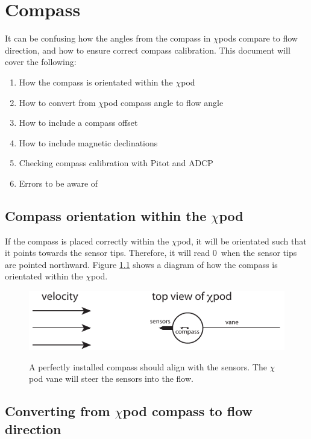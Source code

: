 \chapter{Compass}

It can be confusing how the angles from the compass in $\chi$pods compare to flow direction, and how to ensure correct compass calibration. This document will cover the following:
\begin{enumerate}
\item How the compass is orientated within the $\chi$pod
\item How to convert from $\chi$pod compass angle to flow angle
\item How to include a compass offset
\item How to include magnetic declinations
\item Checking compass calibration with Pitot and ADCP
\item Errors to be aware of
\end{enumerate}

\section{Compass orientation within the $\chi$pod}

If the compass is placed correctly within the $\chi$pod, it will be orientated such that it points towards the sensor tips. Therefore, it will read 0\degree \, when the sensor tips are pointed northward. Figure \ref{fig:cmpveldiag} shows a diagram of how the compass is orientated within the $\chi$pod.

\begin{figure}
  \centering \centering\noindent\includegraphics[width=14cm,angle=0]{./figs/compass_and_velocity_diagram.pdf}\\
    \caption{A perfectly installed compass should align with the sensors. The $\chi$pod vane will steer the sensors into the flow.}\label{fig:cmpveldiag}
\end{figure}

\clearpage


\section{Converting from $\chi$pod compass to flow direction}

